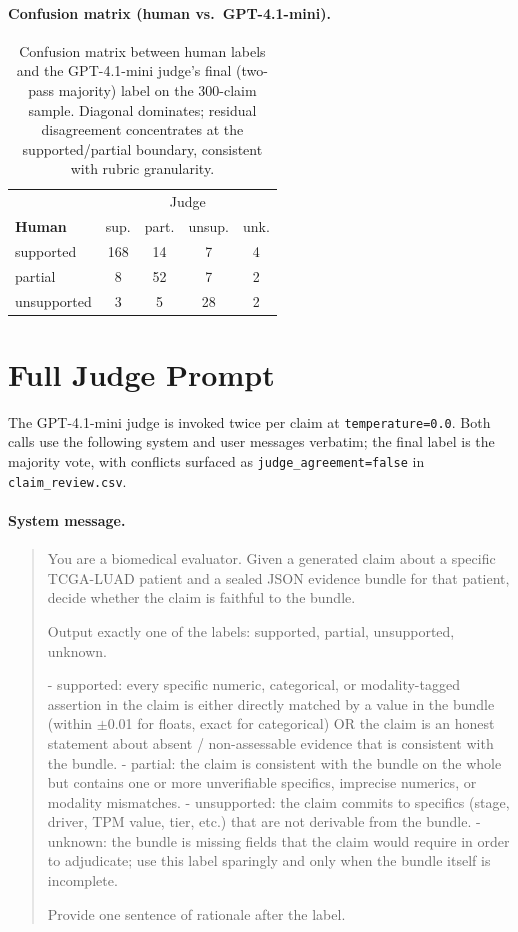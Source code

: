 \documentclass[11pt]{article}
\begin{document}
\paragraph{Confusion matrix (human vs.\ GPT-4.1-mini).}

\begin{table}[h]
\centering
\small
\begin{tabular}{l|cccc}
\toprule
 & \multicolumn{4}{c}{Judge} \\
\textbf{Human} & sup. & part. & unsup. & unk. \\
\midrule
supported   & 168 & 14  & 7  & 4 \\
partial     & 8   & 52  & 7  & 2 \\
unsupported & 3   & 5   & 28 & 2 \\
\bottomrule
\end{tabular}
\caption{Confusion matrix between human labels and the GPT-4.1-mini judge's final (two-pass majority) label on the 300-claim sample. Diagonal dominates; residual disagreement concentrates at the supported/partial boundary, consistent with rubric granularity.}
\label{tab:cm}
\end{table}

\section{Full Judge Prompt}
\label{app:judgeprompt}

The GPT-4.1-mini judge is invoked twice per claim at \texttt{temperature=0.0}. Both calls use the following system and user messages verbatim; the final label is the majority vote, with conflicts surfaced as \texttt{judge\_agreement=false} in \texttt{claim\_review.csv}.

\paragraph{System message.}
\begin{quote}\small\ttfamily
You are a biomedical evaluator. Given a generated claim about a specific TCGA-LUAD patient and a sealed JSON evidence bundle for that patient, decide whether the claim is faithful to the bundle.

Output exactly one of the labels: supported, partial, unsupported, unknown.

- supported: every specific numeric, categorical, or modality-tagged assertion in the claim is either directly matched by a value in the bundle (within $\pm$0.01 for floats, exact for categorical) OR the claim is an honest statement about absent / non-assessable evidence that is consistent with the bundle.
- partial: the claim is consistent with the bundle on the whole but contains one or more unverifiable specifics, imprecise numerics, or modality mismatches.
- unsupported: the claim commits to specifics (stage, driver, TPM value, tier, etc.) that are not derivable from the bundle.
- unknown: the bundle is missing fields that the claim would require in order to adjudicate; use this label sparingly and only when the bundle itself is incomplete.

Provide one sentence of rationale after the label.
\end{quote}
\end{document}
